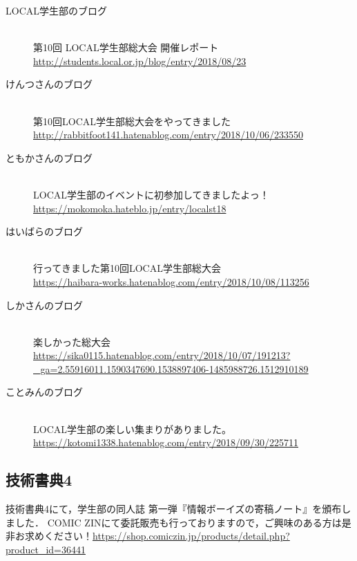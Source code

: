 \begin{description}
\item[LOCAL学生部のブログ]\mbox{}\\
第10回 LOCAL学生部総大会 開催レポート\mbox{}\\
\url{http://students.local.or.jp/blog/entry/2018/08/23}
\end{description}

\begin{description}
\item[けんつさんのブログ]\mbox{}\\
第10回LOCAL学生部総大会をやってきました\mbox{}\\
\url{http://rabbitfoot141.hatenablog.com/entry/2018/10/06/233550}
\end{description}

\begin{description}
\item[ともかさんのブログ]\mbox{}\\
LOCAL学生部のイベントに初参加してきましたよっ！\mbox{}\\
\url{https://mokomoka.hateblo.jp/entry/localst18}
\end{description}

\begin{description}
\item[はいばらのブログ]\mbox{}\\
行ってきました第10回LOCAL学生部総大会\mbox{}\\
\url{https://haibara-works.hatenablog.com/entry/2018/10/08/113256}
\end{description}

\begin{description}
\item[しかさんのブログ]\mbox{}\\
楽しかった総大会\mbox{}\\
\url{https://sika0115.hatenablog.com/entry/2018/10/07/191213?_ga=2.55916011.1590347690.1538897406-1485988726.1512910189}
\end{description}

\begin{description}
\item[ことみんのブログ]\mbox{}\\
LOCAL学生部の楽しい集まりがありました。\mbox{}\\
\url{https://kotomi1338.hatenablog.com/entry/2018/09/30/225711}
\end{description}

\subsection{技術書典4}
技術書典4にて，学生部の同人誌 第一弾『情報ボーイズの寄稿ノート』を頒布しました．
COMIC ZINにて委託販売も行っておりますので，ご興味のある方は是非お求めください！\url{https://shop.comiczin.jp/products/detail.php?product_id=36441}\mbox{}\\

